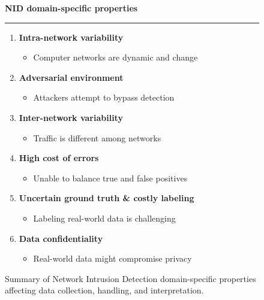 \iffalse
\begin{figure}[t]
    \small
    \textbf{NID domain-specific properties} \\[-5pt]
    \noindent\rule{0.85\linewidth}{0.5pt}
    \begin{enumerate}[topsep=1pt, itemsep=1pt]
        \item \textbf{Intra-network variability}
        \begin{itemize}[topsep=0pt, itemsep=0pt, parsep=0pt, label=$\circ$]
            \item Computer networks are dynamic and change
        \end{itemize}
        
        \item \textbf{Adversarial environment}
        \begin{itemize}[topsep=0pt, itemsep=0pt, parsep=0pt, label=$\circ$]
            \item Attackers attempt to bypass detection
        \end{itemize}
        
        \item \textbf{Inter-network variability}
        \begin{itemize}[topsep=0pt, itemsep=0pt, parsep=0pt, label=$\circ$]
            \item Traffic is different among networks
        \end{itemize}

        \item \textbf{High cost of errors}
        \begin{itemize}[topsep=0pt, itemsep=0pt, parsep=0pt, label=$\circ$]
            \item Unable to balance true and false positives
        \end{itemize}

        \item \textbf{Uncertain ground truth \& costly labeling}
        \begin{itemize}[topsep=0pt, itemsep=0pt, parsep=0pt, label=$\circ$]
            \item Labeling real-world data is challenging
        \end{itemize}

        \item \textbf{Data confidentiality}
        \begin{itemize}[topsep=0pt, itemsep=0pt, parsep=0pt, label=$\circ$]
            \item Real-world data might compromise privacy
        \end{itemize}
    \end{enumerate}
    \caption{Summary of Network Intrusion Detection domain-specific properties affecting data collection, handling, and interpretation.}
    \label{fig:nid_properties}
\end{figure}
